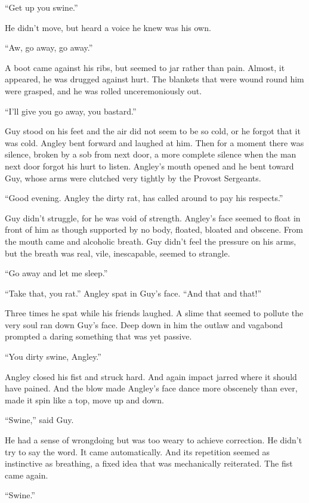 ``Get up you swine.''

He didn't move, but heard a voice he knew was his own.

``Aw, go away, go away.''

A boot came against his ribs, but seemed to jar rather than pain. 
Almost, it appeared, he was drugged against hurt. The blankets 
that were wound round him were grasped, and he was rolled 
unceremoniously out.

``I'll give you go away, you bastard.''

Guy stood on his feet and the air did not seem to be so cold, or 
he forgot that it was cold. Angley bent forward and laughed at 
him. Then for a moment there was silence, broken by a sob from next 
door, a more complete silence when the man next door forgot his 
hurt to listen. Angley's mouth opened and he bent toward Guy, 
whose arms were clutched very tightly by the Provost 
Sergeants.

``Good evening. Angley the dirty rat, has called around to pay 
his respects.''

Guy didn't struggle, for he was void of strength. Angley's face seemed 
to float in front of him as though supported by no body, floated, 
bloated and obscene. From the mouth came and alcoholic breath. 
Guy didn't feel the pressure on his arms, but the breath was 
real, vile, inescapable, seemed to strangle.

``Go away and let me sleep.''

``Take that, you rat.'' Angley spat in Guy's face. ``And that 
and that!''

Three times he spat while his friends laughed. A slime that 
seemed to pollute the very soul ran down Guy's face. Deep down 
in him the outlaw and vagabond prompted a daring something that 
was yet passive.

``You dirty swine, Angley.''

Angley closed his fist and struck hard. And again impact jarred 
where it should have pained. And the blow made Angley's face 
dance more obscenely than ever, made it spin like a top, move up 
and down.

``Swine,'' said Guy.

He had a sense of wrongdoing but was too weary to achieve correction. 
He didn't try to say the word. It came automatically. And its 
repetition seemed as instinctive as breathing, a fixed idea that 
was mechanically reiterated. The fist came again.

``Swine.''

